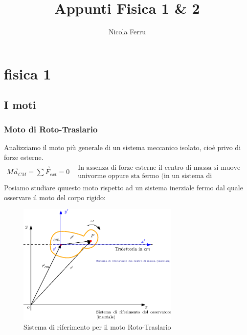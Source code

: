 \documentclass{book}
\title{Appunti Fisica 1 \& 2}
\author{Nicola Ferru}
\date{}
\begin{document}

\tableofcontents
\listoftables
\listoffigures


\part{fisica 1}


\chapter{I moti}
\section{Moto di Roto-Traslario}
Analizziamo il moto più generale di un sistema meccanico isolato, cioè privo di forze
esterne.
\begin{eqnarray*}
  M\vec{a}_{CM}=\displaystyle\sum \vec{F}_{ext}=0 & \begin{matrix}
                                                      \text{In assenza di forze esterne
                                                      il centro di massa si muove di
                                                      moto retilineo}\\
                                                      \text{univorme oppure sta
                                                      fermo (in un sistema di
                                                      riferimento inerziale)}
                                                    \end{matrix}
\end{eqnarray*}
Posiamo studiare quuesto moto rispetto ad un sistema inerziale fermo dal quale
osservare il moto del corpo rigido:
\begin{figure}[ht]
  \centering
  \includegraphics[width=8cm]{img/finiti/roto-trasl.eps}
  \caption{Sistema di riferimento per il moto Roto-Traslario}
  \label{fig:roto-traslario}
\end{figure}
\end{document}
